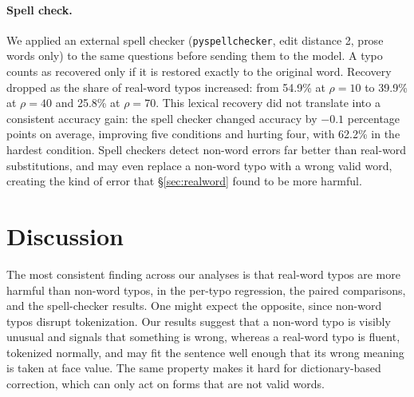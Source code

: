 \documentclass[11pt]{article}
\begin{document}
\paragraph{Spell check.}
We applied an external spell checker (\texttt{pyspellchecker}, edit distance 2,
prose words only) to the same questions before sending them to the model. A
typo counts as recovered only if it is restored exactly to the original word.
Recovery dropped as the share of real-word typos increased: from 54.9\% at
$\rho{=}10$ to 39.9\% at $\rho{=}40$ and 25.8\% at $\rho{=}70$. This lexical
recovery did not translate into a consistent accuracy gain: the spell checker
changed accuracy by $-0.1$ percentage points on average, improving five
conditions and hurting four, with 62.2\% in the hardest condition. Spell
checkers detect non-word errors far better than real-word substitutions, and
may even replace a non-word typo with a wrong valid word, creating the kind of
error that \S\ref{sec:realword} found to be more harmful.

\begin{table}[tbp]
\centering
\footnotesize
\setlength{\tabcolsep}{4pt}

\caption{GSM8K answered-only accuracy (\%) under each mitigation, per
configuration, with the change against the unmodified prompt (\emph{no fix}).
The mean row is taken over the nine typo configurations.}
\label{tab:fixes}
\end{table}

\section{Discussion}

The most consistent finding across our analyses is that real-word typos are more
harmful than non-word typos, in the per-typo regression, the paired comparisons,
and the spell-checker results. One might expect the opposite, since non-word
typos disrupt tokenization. Our results suggest that a non-word typo is visibly
unusual and signals that something is wrong, whereas a real-word typo is fluent,
tokenized normally, and may fit the sentence well enough that its wrong meaning
is taken at face value. The same property makes it hard for dictionary-based
correction, which can only act on forms that are not valid words.
\end{document}
